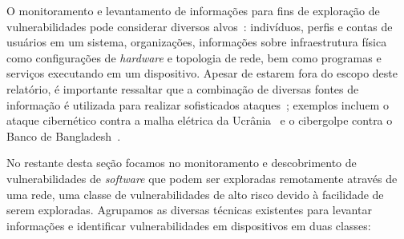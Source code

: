 O monitoramento e levantamento de informações para fins de exploração de vulnerabilidades pode considerar diversos alvos~\cite{roy2022survey}: indivíduos, perfis e contas de usuários em um sistema, organizações, informações sobre infraestrutura física como configurações de \emph{hardware} e topologia de rede, bem como programas e serviços executando em um dispositivo. Apesar de estarem fora do escopo deste relatório, é importante ressaltar que a combinação de diversas fontes de informação é utilizada para realizar sofisticados ataques~\cite{hassan2018technical, albladi2018user}; exemplos incluem o ataque cibernético contra a malha elétrica da Ucrânia~\cite{defense16ukraine} e o cibergolpe contra o Banco de Bangladesh~\cite{hill18heist}.

No restante desta seção focamos no monitoramento e descobrimento de vulnerabilidades de \emph{software} que podem ser exploradas remotamente através de uma rede, uma classe de vulnerabilidades de alto risco devido à facilidade de serem exploradas. Agrupamos as diversas técnicas existentes para levantar informações e identificar vulnerabilidades em dispositivos em duas classes:

